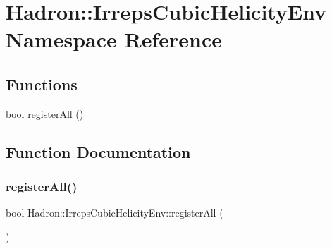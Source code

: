 \hypertarget{namespaceHadron_1_1IrrepsCubicHelicityEnv}{}\section{Hadron\+:\+:Irreps\+Cubic\+Helicity\+Env Namespace Reference}
\label{namespaceHadron_1_1IrrepsCubicHelicityEnv}
\subsection*{Functions}
\begin{DoxyCompactItemize}
\item 
bool \mbox{\hyperlink{namespaceHadron_1_1IrrepsCubicHelicityEnv_a3c43156ee3e7bda6a9a9536083bfdeff}{register\+All}} ()
\end{DoxyCompactItemize}


\subsection{Function Documentation}
\mbox{\label{namespaceHadron_1_1IrrepsCubicHelicityEnv_a3c43156ee3e7bda6a9a9536083bfdeff}} 
\subsubsection{\texorpdfstring{registerAll()}{registerAll()}}
{\footnotesize\ttfamily bool Hadron\+::\+Irreps\+Cubic\+Helicity\+Env\+::register\+All (\begin{DoxyParamCaption}{ }\end{DoxyParamCaption})}

